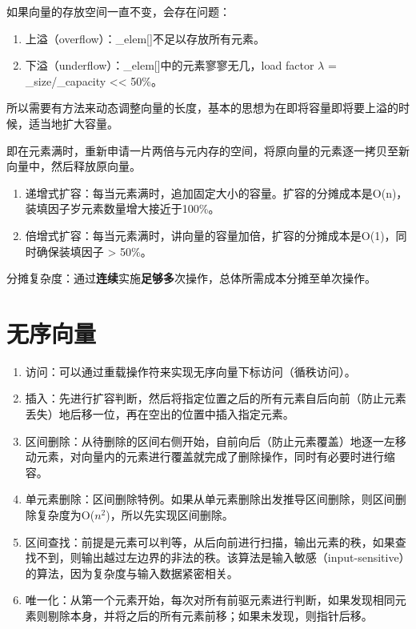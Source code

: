 \documentclass{article}
\begin{document}
如果向量的存放空间一直不变，会存在问题：
\begin{enumerate}
  \item 上溢（overflow）：\_elem[]不足以存放所有元素。
  \item 下溢（underflow）：\_elem[]中的元素寥寥无几，load factor $\lambda$ = \_size/\_capacity << 50\%。
\end{enumerate}

所以需要有方法来动态调整向量的长度，基本的思想为在即将容量即将要上溢的时候，适当地扩大容量。

即在元素满时，重新申请一片两倍与元内存的空间，将原向量的元素逐一拷贝至新向量中，然后释放原向量。

\begin{enumerate}
  \item 递增式扩容：每当元素满时，追加固定大小的容量。扩容的分摊成本是O(n)，装填因子岁元素数量增大接近于100\%。
  \item 倍增式扩容：每当元素满时，讲向量的容量加倍，扩容的分摊成本是O(1)，同时确保装填因子 > 50\%。
\end{enumerate}

分摊复杂度：通过\textbf{连续}实施\textbf{足够多}次操作，总体所需成本分摊至单次操作。

\section{无序向量}

\begin{enumerate}
  \item 访问：可以通过重载操作符来实现无序向量下标访问（循秩访问）。
  \item 插入：先进行扩容判断，然后将指定位置之后的所有元素自后向前（防止元素丢失）地后移一位，再在空出的位置中插入指定元素。
  \item 区间删除：从待删除的区间右侧开始，自前向后（防止元素覆盖）地逐一左移动元素，对向量内的元素进行覆盖就完成了删除操作，同时有必要时进行缩容。
  \item 单元素删除：区间删除特例。如果从单元素删除出发推导区间删除，则区间删除复杂度为O($n^2$)，所以先实现区间删除。
  \item 区间查找：前提是元素可以判等，从后向前进行扫描，输出元素的秩，如果查找不到，则输出越过左边界的非法的秩。该算法是输入敏感（input-sensitive）的算法，因为复杂度与输入数据紧密相关。
  \item 唯一化：从第一个元素开始，每次对所有前驱元素进行判断，如果发现相同元素则剔除本身，并将之后的所有元素前移；如果未发现，则指针后移。
\end{enumerate}
\end{document}
